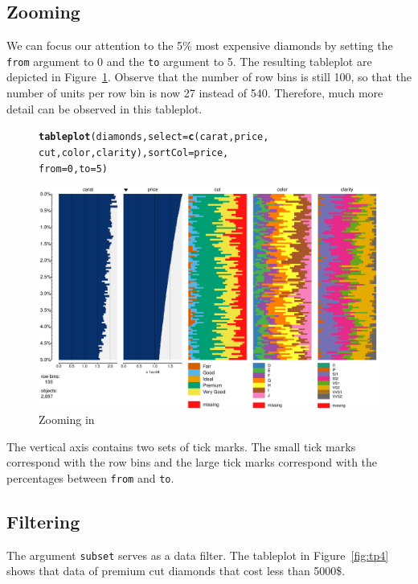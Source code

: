 \documentclass[11pt, fleqn, a4paper]{article}\usepackage{graphicx, color}
\makeatletter
\def\maxwidth{ %
  \ifdim\Gin@nat@width>\linewidth
    \linewidth
  \else
    \Gin@nat@width
  \fi
}
\newcommand{\hlfunctioncall}[1]{\textcolor[rgb]{0.501960784313725,0,0.329411764705882}{\textbf{#1}}}%
\newenvironment{kframe}{%
 \def\at@end@of@kframe{}%
 \ifinner\ifhmode%
  \def\at@end@of@kframe{\end{minipage}}%
  \begin{minipage}{\columnwidth}%
 \fi\fi%
 \def\FrameCommand##1{\hskip\@totalleftmargin \hskip-\fboxsep
 \colorbox{shadecolor}{##1}\hskip-\fboxsep
     \hskip-\linewidth \hskip-\@totalleftmargin \hskip\columnwidth}%
 \MakeFramed {\advance\hsize-\width
   \@totalleftmargin\z@ \linewidth\hsize
   \@setminipage}}%
 {\par\unskip\endMakeFramed%
 \at@end@of@kframe}
\newenvironment{knitrout}{}{} %
\makeatother
\begin{document}
\subsection{Zooming}
We can focus our attention to the 5\% most expensive diamonds by setting the {\tt from} argument to 0 and the {\tt to} argument to 5. The resulting tableplot are depicted in Figure~\ref{fig:tp3}. Observe that the number of row bins is still 100, so that the number of units per row bin is now 27 instead of 540. Therefore, much more detail can be observed in this tableplot.


\begin{figure}[!htp]
\begin{knitrout}
\color{fgcolor}\begin{kframe}
\begin{alltt}
\hlfunctioncall{tableplot}(diamonds, select = \hlfunctioncall{c}(carat, price, 
    cut, color, clarity), sortCol = price, 
    from = 0, to = 5)
\end{alltt}
\end{kframe}
\includegraphics[width=\maxwidth]{figure/chunk4} 

\end{knitrout}

\caption{Zooming in}
\label{fig:tp3}
\end{figure}

The vertical axis contains two sets of tick marks. The small tick marks correspond with the row bins and the large tick marks correspond with the percentages between {\tt from} and {\tt to}.


\subsection{Filtering}\label{secfilt}
The argument {\tt subset} serves as a data filter. The tableplot in Figure~\ref{fig:tp4} shows that data of premium cut diamonds that cost less than 5000\$.
\end{document}
